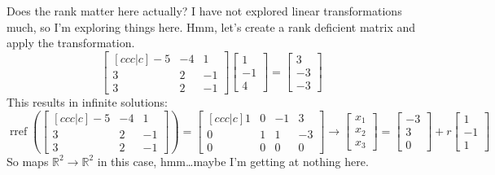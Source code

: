 \documentclass[basic]{inVerba-notes}
\begin{document}
\begin{enumerate}[align=left, leftmargin=0pt, labelindent=\parindent, listparindent=\parindent, labelwidth=0pt, itemindent=!]
  Does the rank matter here actually? I have not explored linear transformations much, so I'm exploring things here. Hmm, let's create a rank deficient matrix and apply the transformation.
  \[%
  \begin{bmatrix}[ccc|c]
    -5 & -4 & 1 \\
    3 & 2 & -1  \\
    3 & 2 & -1  
  \end{bmatrix} 
  \begin{bmatrix} 1 \\ -1 \\ 4 \end{bmatrix} =
  \begin{bmatrix} 3 \\ -3 \\ -3 \end{bmatrix}
  \]%
  This results in infinite solutions:
  \[%
  \operatorname{rref}\left(\begin{bmatrix}[ccc|c]
    -5 & -4 & 1 \\
    3 & 2 & -1  \\
    3 & 2 & -1  
  \end{bmatrix}\right)
  =
  \begin{bmatrix}[ccc|c]
    1 & 0 & -1 & 3 \\
    0 & 1 & 1 & -3 \\
    0 & 0 & 0 & 0 
  \end{bmatrix} 
  \to 
  \begin{bmatrix} x_1 \\ x_2 \\ x_3 \end{bmatrix} = 
  \begin{bmatrix} -3 \\ 3 \\ 0 \end{bmatrix} + r
  \begin{bmatrix} 1 \\ -1 \\ 1 \end{bmatrix}
  \]%
  So  maps \(\mathbb{R}^2 \to \mathbb{R}^2\) in this case, hmm\dots maybe I'm getting at nothing here. 

\end{enumerate}
\end{document}
